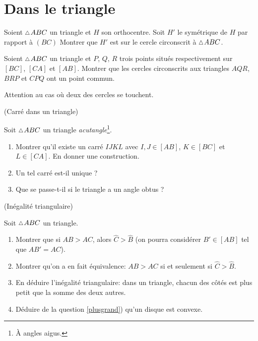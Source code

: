 \documentclass[a4paper,11pt,reqno]{amsart}
\begin{document}
\section{Dans le triangle}

\begin{exo}[.49]

  Soient $\tri ABC$ un triangle et $H$ son orthocentre. Soit $H'$ le symétrique de $H$ par rapport à $(BC)$ Montrer que $H'$ est sur le cercle circonscrit à $\tri ABC$.
\end{exo}

\begin{exo}[.7]

  Soient $\tri ABC$ un triangle et $P$, $Q$, $R$ trois points situés respectivement sur $[BC]$, $[CA]$ et $[AB]$. Montrer que les cercles circonscrits aux triangles $AQR$, $BRP$ et $CPQ$ ont un point commun.\\
  \begin{indication}
    Attention au cas où deux des cercles se touchent.
  \end{indication}
\end{exo}


\begin{exo} (Carré dans un triangle)

  Soit $\tri ABC$ un triangle \emph{acutangle}\footnote{À angles aigus.}.
  \begin{enumerate}
    \item Montrer qu'il existe un carré $IJKL$ avec $I,J \in [AB]$, $K \in [BC]$ et $L \in [CA]$. En donner une construction.
    \item Un tel carré est-il unique ?
    \item Que se passe-t-il si le triangle a un angle obtus ?
  \end{enumerate}
\end{exo}

\begin{exo} (Inégalité triangulaire)

  Soit $\tri ABC$ un triangle.
  \begin{enumerate}
    \item \label{plusgrand} Montrer que si $AB > AC$, alors $\widehat{C}>\widehat{B}$ (on pourra considérer $B' \in [AB]$ tel que $AB'=AC$). %
    \item Montrer qu'on a en fait équivalence: $AB>AC$ si et seulement si $\widehat{C}>\widehat{B}$.
    \item En déduire l'inégalité triangulaire: dans un triangle, chacun des côtés est plus petit que la somme des deux autres.
    \item Déduire de la question \ref{plusgrand}) qu'un disque est convexe.
  \end{enumerate}
\end{exo}
\end{document}
